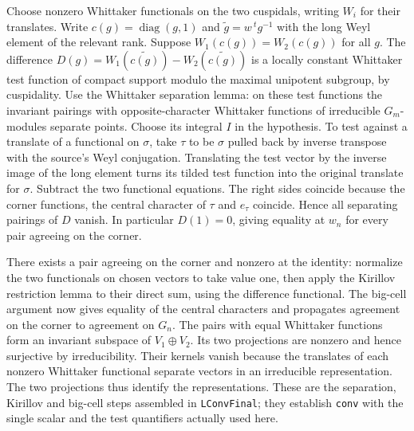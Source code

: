 Choose nonzero Whittaker functionals on the two cuspidals, writing
$W_i$ for their translates. Write $c(g)=\operatorname{diag}(g,1)$
and $\widetilde g=w\,{}^tg^{-1}$ with the long Weyl element of the
relevant rank. Suppose $W_1(c(g))=W_2(c(g))$ for all $g$. The
difference $D(g)=W_1(\widetilde{c(g)})-W_2(\widetilde{c(g)})$
is a locally constant Whittaker test function of compact support
modulo the maximal unipotent subgroup, by cuspidality. Use the
Whittaker separation lemma: on these test functions the invariant
pairings with opposite-character Whittaker functions of irreducible
$G_m$-modules separate points. Choose its integral $I$ in the
hypothesis. To test against a translate of a functional on $\sigma$,
take $\tau$ to be $\sigma$ pulled back by inverse transpose with
the source's Weyl conjugation. Translating the test vector by the
inverse image of the long element turns its tilded test function
into the original translate for $\sigma$. Subtract the two functional
equations. The right sides coincide because the corner functions,
the central character of $\tau$ and $e_\tau$ coincide. Hence all
separating pairings of $D$ vanish. In particular $D(1)=0$, giving
equality at $w_n$ for every pair agreeing on the corner.

There exists a pair agreeing on the corner and nonzero at the
identity: normalize the two functionals on chosen vectors to take
value one, then apply the Kirillov restriction lemma to their
direct sum, using the difference functional. The big-cell argument
now gives equality of the central characters and propagates agreement
on the corner to agreement on $G_n$. The pairs with equal Whittaker
functions form an invariant subspace of $V_1\oplus V_2$. Its two
projections are nonzero and hence surjective by irreducibility.
Their kernels vanish because the translates of each nonzero
Whittaker functional separate vectors in an irreducible representation.
The two projections thus identify the representations. These are the
separation, Kirillov and big-cell steps assembled in
\texttt{LConvFinal}; they establish \texttt{conv} with the single
scalar and the test quantifiers actually used here.

